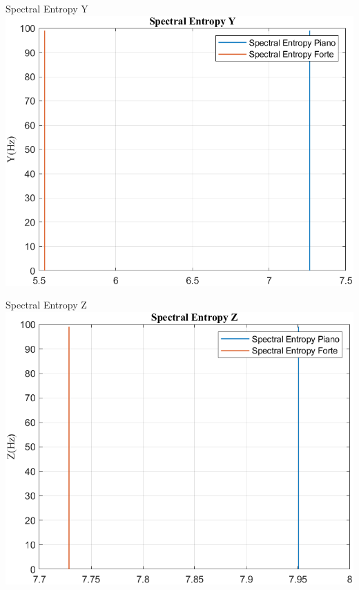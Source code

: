 	\begin{frame}{{Spectral Entropy Y}}
		\centering\includegraphics[height=.8\textheight]{figure/Mag/Trasformata/Spectral EntropyY}
	\end{frame}
	
	\begin{frame}{{Spectral Entropy Z}}
		\centering\includegraphics[height=.8\textheight]{figure/Mag/Trasformata/Spectral EntropyZ}
	\end{frame}
	

